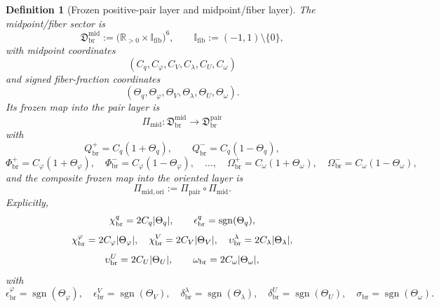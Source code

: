 \documentclass[11pt]{article}
\newcommand{\AbsReadAmp}{\chi_{\mathrm{br}}^{q}}
\newcommand{\AbsCovAmp}{\chi_{\mathrm{br}}^{\varphi}}
\newcommand{\AbsRelaxAmp}{\chi_{\mathrm{br}}^{V}}
\newcommand{\AbsWellAmp}{\upsilon_{\mathrm{br}}^{\lambda}}
\newcommand{\AbsEqAmp}{\upsilon_{\mathrm{br}}^{U}}
\newcommand{\AbsScaleAmp}{\omega_{\mathrm{br}}}
\newcommand{\PolRead}{\epsilon_{\mathrm{br}}^{q}}
\newcommand{\PolCov}{\epsilon_{\mathrm{br}}^{\varphi}}
\newcommand{\PolRelax}{\epsilon_{\mathrm{br}}^{V}}
\newcommand{\PolWell}{\delta_{\mathrm{br}}^{\lambda}}
\newcommand{\PolEq}{\delta_{\mathrm{br}}^{U}}
\newcommand{\PolScale}{\sigma_{\mathrm{br}}}
\newcommand{\PairSector}{\mathfrak D_{\mathrm{br}}^{\mathrm{pair}}}
\newcommand{\PairMap}{\Pi_{\mathrm{pair}}}
\newcommand{\PairReadPlus}{Q_{\mathrm{br}}^{+}}
\newcommand{\PairReadMinus}{Q_{\mathrm{br}}^{-}}
\newcommand{\PairCovPlus}{\Phi_{\mathrm{br}}^{+}}
\newcommand{\PairCovMinus}{\Phi_{\mathrm{br}}^{-}}
\newcommand{\PairScalePlus}{\Omega_{\mathrm{br}}^{+}}
\newcommand{\PairScaleMinus}{\Omega_{\mathrm{br}}^{-}}
\newcommand{\MidFiberSector}{\mathfrak D_{\mathrm{br}}^{\mathrm{mid}}}
\newcommand{\MidPairMap}{\Pi_{\mathrm{mid}}}
\newcommand{\MidOriginMap}{\Pi_{\mathrm{mid,ori}}}
\newcommand{\MidRead}{C_{q}}
\newcommand{\MidCov}{C_{\varphi}}
\newcommand{\MidRelax}{C_{V}}
\newcommand{\MidWell}{C_{\lambda}}
\newcommand{\MidEq}{C_{U}}
\newcommand{\MidScale}{C_{\omega}}
\newcommand{\FiberRead}{\Theta_{q}}
\newcommand{\FiberCov}{\Theta_{\varphi}}
\newcommand{\FiberRelax}{\Theta_{V}}
\newcommand{\FiberWell}{\Theta_{\lambda}}
\newcommand{\FiberEq}{\Theta_{U}}
\newcommand{\FiberScale}{\Theta_{\omega}}
\newcommand{\FiberDom}{\mathbb I_{\mathrm{fib}}}
\newtheorem{definition}{Definition}
\begin{document}
\begin{definition}[Frozen positive-pair layer and midpoint/fiber layer]
The midpoint/fiber sector is
\begin{equation}
\MidFiberSector
:=
\bigl(\mathbb R_{>0}\times\FiberDom\bigr)^{6},
\qquad
\FiberDom:=(-1,1)\setminus\{0\},
\label{eq:midsector}
\end{equation}
with midpoint coordinates
\begin{equation}
(\MidRead,\MidCov,\MidRelax,\MidWell,\MidEq,\MidScale)
\label{eq:midcoords}
\end{equation}
and signed fiber-fraction coordinates
\begin{equation}
(\FiberRead,\FiberCov,\FiberRelax,\FiberWell,\FiberEq,\FiberScale).
\label{eq:fibercoords}
\end{equation}
Its frozen map into the pair layer is
\begin{equation}
\MidPairMap:\MidFiberSector\longrightarrow\PairSector
\label{eq:midpairmap}
\end{equation}
with
\begin{equation}
\PairReadPlus=\MidRead(1+\FiberRead),
\qquad
\PairReadMinus=\MidRead(1-\FiberRead),
\label{eq:midpairsA}
\end{equation}
\begin{equation}
\PairCovPlus=\MidCov(1+\FiberCov),
\quad
\PairCovMinus=\MidCov(1-\FiberCov),
\quad
\ldots,
\quad
\PairScalePlus=\MidScale(1+\FiberScale),
\quad
\PairScaleMinus=\MidScale(1-\FiberScale),
\label{eq:midpairsB}
\end{equation}
and the composite frozen map into the oriented layer is
\begin{equation}
\MidOriginMap:=\PairMap\circ\MidPairMap.
\label{eq:midorigin}
\end{equation}
Explicitly,
\begin{equation}
\AbsReadAmp=2\MidRead\abs{\FiberRead},
\qquad
\PolRead=\operatorname{sgn}(\FiberRead),
\label{eq:midoriginA}
\end{equation}
\begin{equation}
\AbsCovAmp=2\MidCov\abs{\FiberCov},
\quad
\AbsRelaxAmp=2\MidRelax\abs{\FiberRelax},
\quad
\AbsWellAmp=2\MidWell\abs{\FiberWell},
\label{eq:midoriginB}
\end{equation}
\begin{equation}
\AbsEqAmp=2\MidEq\abs{\FiberEq},
\qquad
\AbsScaleAmp=2\MidScale\abs{\FiberScale},
\label{eq:midoriginC}
\end{equation}
with
\begin{equation}
\PolCov=\operatorname{sgn}(\FiberCov),
\quad
\PolRelax=\operatorname{sgn}(\FiberRelax),
\quad
\PolWell=\operatorname{sgn}(\FiberWell),
\quad
\PolEq=\operatorname{sgn}(\FiberEq),
\quad
\PolScale=\operatorname{sgn}(\FiberScale).
\label{eq:midoriginD}
\end{equation}
\end{definition}
\end{document}
